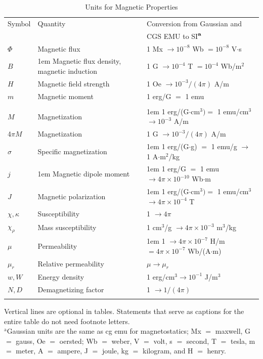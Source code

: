 \documentclass{IEEEjmw}
\begin{document}
\begin{table}
\caption{Units for Magnetic Properties}
\label{table}
\tablefont
\begin{tabular*}{20.25pc}{@{}p{29pt}p{81pt}<{\raggedright}p{113pt}<{\raggedright}@{}}
\hline\\[-1.5pc]\hline
{Symbol}& 
\centerline{Quantity}& 
\centerline{Conversion from Gaussian and} \\[-16pt]
&&\centerline{CGS EMU to SI$^{\mathrm{\bf a}}$} \\[-16pt]
\hline
$\Phi $& 
Magnetic flux& 
1 Mx $\to  10^{-8}$ Wb $= 10^{-8}$ V$\cdot$s \\
$B$& 
\hangindent1em Magnetic flux density,   magnetic induction& 
1 G $\to  10^{-4}$ T $= 10^{-4}$ Wb/m$^{2}$ \\
$H$& 
Magnetic field strength& 
1 Oe $\to  10^{-3}/(4\pi )$ A/m \\
$m$& 
Magnetic moment& 
1 erg/G $=$ 1 emu  \\ && \hskip1em $\to 10^{-3}$ A$\cdot$m$^{2} = 10^{-3}$ J/T \\
$M$& 
Magnetization& 
\hangindent1em 1 erg/(G$\cdot$cm$^{3}) =$ 1 emu/cm$^{3}$   $\to 10^{-3}$ A/m \\
4$\pi M$& 
Magnetization& 
1 G $\to  10^{-3}/(4\pi )$ A/m \\
$\sigma $& 
Specific magnetization& 
\hangindent1em 1 erg/(G$\cdot$g) $=$ 1 emu/g $\to $ 1 A$\cdot$m$^{2}$/kg \\
$j$& 
\hangindent1em Magnetic dipole   moment& 
\hangindent1em 1 erg/G $=$ 1 emu\break   $\to 4\pi \times  10^{-10}$ Wb$\cdot$m \\
$J$& 
Magnetic polarization& 
\hangindent1em 1 erg/(G$\cdot$cm$^{3}) =$ 1 emu/cm$^{3}$  $\to 4\pi\times10^{-4}$ T \\
$\chi , \kappa $& 
Susceptibility& 
1 $\to  4\pi $ \\
$\chi_{\rho }$& 
Mass susceptibility& 
1 cm$^{3}$/g $\to  4\pi \times  10^{-3}$ m$^{3}$/kg \\
$\mu $& 
Permeability& 
\hangindent1em 1 $\to  4\pi \times  10^{-7}$ H/m   $= 4\pi \times  10^{-7}$ Wb/(A$\cdot$m) \\
$\mu_{r}$& 
Relative permeability& 
$\mu \to \mu_{r}$ \\
$w, W$& 
Energy density& 
1 erg/cm$^{3} \to  10^{-1}$ J/m$^{3}$ \\
$N, D$& 
Demagnetizing factor& 
1 $\to  1/(4\pi )$ \\
\hline\\[-1.5pc]\hline
\end{tabular*}
\begin{tabnote}
{Vertical lines are optional in tables. Statements that serve as captions for 
the entire table do not need footnote letters. }\\
{$^{\mathrm{a}}$Gaussian units are the same as cg emu for magnetostatics; Mx 
$=$ maxwell, G $=$ gauss, Oe $=$ oersted; Wb $=$ weber, V $=$ volt, s $=$ 
second, T $=$ tesla, m $=$ meter, A $=$ ampere, J $=$ joule, kg $=$ 
kilogram, and H $=$ henry.}
\end{tabnote}
\label{tab1}
\end{table}
\end{document}
